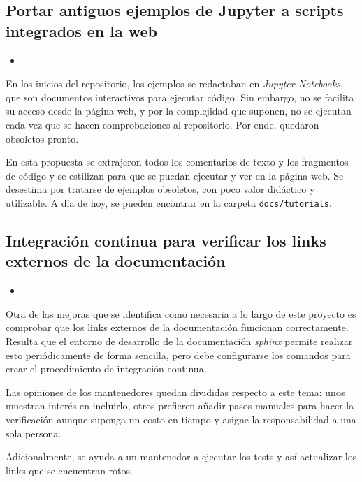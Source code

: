 \subsection{Portar antiguos ejemplos de Jupyter a scripts integrados en la web}

\begin{itemize}
    \item {}
\end{itemize}

En los inicios del \gls{repositorio}, los ejemplos se redactaban en \textit{Jupyter Notebooks}, que son documentos interactivos para ejecutar código. Sin embargo, no se facilita su acceso desde la página web, y por la complejidad que suponen, no se ejecutan cada vez que se hacen comprobaciones al repositorio. Por ende, quedaron obsoletos pronto.

En esta propuesta se extrajeron todos los comentarios de texto y los fragmentos de código y se estilizan para que se puedan ejecutar y ver en la página web. Se desestima por tratarse de ejemplos obsoletos, con poco valor didáctico y utilizable. A día de hoy, se pueden encontrar en la carpeta \texttt{docs/tutorials}.

\subsection{Integración continua para verificar los links externos de la documentación}

\begin{itemize}
    \item {}
\end{itemize}

Otra de las mejoras que se identifica como necesaria a lo largo de este proyecto es comprobar que los links externos de la documentación funcionan correctamente. Resulta que el \gls{entorno de desarrollo} de la documentación \textit{sphinx} permite realizar esto periódicamente de forma sencilla, pero debe configurarse los comandos para crear el procedimiento de integración continua.

Las opiniones de los mantenedores quedan divididas respecto a este tema: unos muestran interés en incluirlo, otros prefieren añadir pasos manuales para hacer la verificación aunque suponga un costo en tiempo y asigne la responsabilidad a una sola persona.

Adicionalmente, se ayuda a un mantenedor a ejecutar los tests y así actualizar los links que se encuentran rotos.

